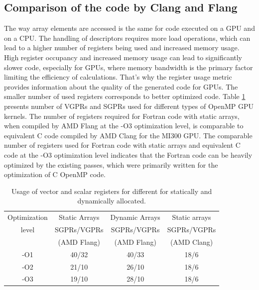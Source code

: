 \documentclass[acmtog,natbib=false]{acmart}
\begin{document}
\subsection{Comparison of the code by Clang and Flang}
The way array elements are accessed is the same for code executed on a GPU and on a CPU.
The handling of descriptors requires more load operations, which can lead to a higher number of registers being used and increased memory usage.
High register occupancy and increased memory usage can lead to significantly slower code, especially for GPUs, where memory bandwidth is the primary factor limiting the efficiency of calculations.
That's why the register usage metric provides information about the quality of the generated code for GPUs.
The smaller number of used registers corresponds to better optimized code.
Table \ref{tab:registerUsage} presents number of VGPRs and SGPRs used for different types of OpenMP GPU kernels.
The number of registers required for Fortran code with static arrays, when compiled by AMD Flang at the -O3 optimization level, is comparable to equivalent C code compiled by AMD Clang for the MI300 GPU.
The comparable number of registers used for Fortran code with static arrays and equivalent C code at the -O3 optimization level indicates that the Fortran code can be heavily optimized by the existing passes, which were primarily written for the optimization of C OpenMP code.

\begin{table}
    \small
    \caption{Usage of vector and scalar registers for different for statically and dynamically allocated.}
    \label{tab:registerUsage}
    \begin{tabular}{|c|c|c|c|}\hline
         Optimization &  Static Arrays &  Dynamic Arrays & Static arrays\\
         level        &  SGPRs/VGPRs    & SGPRs/VGPRs     &SGPRs/VGPRs  \\
                      &  (AMD Flang)   &  (AMD Flang)    & (AMD Clang) \\
        \hline\hline
         -O1&  40/32&  40/33& 18/6\\
         \hline
         -O2&  21/10&  26/10& 18/6\\
         \hline
         -O3&  19/10&  28/10& 18/6\\
         \hline
    \end{tabular}

\end{table}
\end{document}
